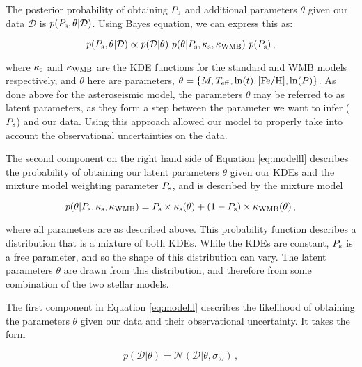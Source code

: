 The posterior probability of obtaining $P_{\rm s}$ and additional parameters $\theta$ given our data $\mathcal{D}$ is $p(P_{\rm{s}}, \theta | \mathcal{D})$. Using Bayes equation, we can express this as:

\begin{equation}\label{eq:modelll}
	p(P_{\rm{s}}, \theta | \mathcal{D}) \propto p(\mathcal{D} | \theta)\ p(\theta | P_{\rm{s}}, \kappa_{\rm{s}}, \kappa_{\rm{WMB}})\ p(P_{\rm{s}})\, ,
\end{equation}

\noindent where $\kappa_{\rm{s}}$ and $\kappa_{\rm{WMB}}$ are the KDE functions for the standard and WMB models respectively, and $\theta$ here are parameters, $\theta = \{M, \mbox{$T_{\rm eff}$}, \ln(t), \mbox{$\rm{[Fe/H]}$}, \ln(P)\}$. As done above for the asteroseismic model, the parameters $\theta$ may be referred to as latent parameters, as they form a step between the parameter we want to infer ($P_{\rm{s}}$) and our data. Using this approach allowed our model to properly take into account the observational uncertainties on the data.

The second component on the right hand side of Equation \ref{eq:modelll} describes the probability of obtaining our latent parameters $\theta$ given our KDEs and the mixture model weighting parameter $P_{\rm s}$, and is described by the mixture model

\begin{equation}\label{eq:mixturell}
	p(\theta | P_{\rm{s}}, \kappa_{\rm{s}}, \kappa_{\rm{WMB}}) = P_{\rm s} \times \kappa_{\rm s}(\theta) + (1 - P_{\rm s}) \times \kappa_{\rm WMB}(\theta)\, ,
\end{equation}

\noindent where all parameters are as described above. This probability function describes a distribution that is a mixture of both KDEs. While the KDEs are constant, $P_{\rm s}$ is a free parameter, and so the shape of this distribution can vary. The latent parameters $\theta$ are drawn from this distribution, and therefore from some combination of the two stellar models.

The first component in Equation \ref{eq:modelll} describes the likelihood of obtaining the parameters $\theta$ given our data and their observational uncertainty. It takes the form

\begin{equation}
	p(\mathcal{D} | \theta) = \mathcal{N}(\mathcal{D} | \theta, \sigma_{\mathcal{D}})\, ,
\end{equation}

